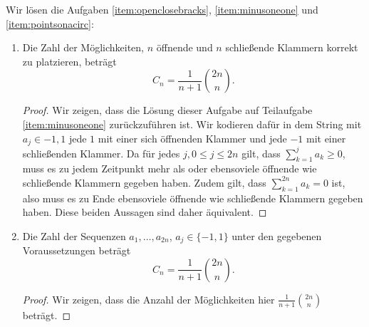 \documentclass{scrartcl} %
\begin{document}
    \begin{aufgabe}
        Wir lösen die Aufgaben \ref{item:openclosebracks}, \ref{item:minusoneone} und \ref{item:pointsonacirc}:
        \begin{enumerate}[label=(\alph*)]
            \item\label{item:openclosebracks} Die Zahl der Möglichkeiten, $n$ öffnende und $n$ schließende Klammern korrekt zu platzieren, beträgt
            \[
                C_n = \frac{1}{n + 1}\binom{2n}{n}.
            \]
            \begin{proof}
                Wir zeigen, dass die Lösung dieser Aufgabe auf Teilaufgabe \ref{item:minusoneone} zurückzuführen ist. Wir kodieren dafür in dem String mit $a_j \in {-1, 1}$ jede $1$ mit einer sich öffnenden Klammer und jede $-1$ mit einer schließenden Klammer. Da für jedes $j, 0 \leq j \leq 2n$ gilt, dass $\sum_{k = 1}^j a_k\geq 0$, muss es zu jedem Zeitpunkt mehr als oder ebensoviele öffnende wie schließende Klammern gegeben haben. Zudem gilt, dass $\sum_{k = 1}^{2n} a_k = 0$ ist, also muss es zu Ende ebensoviele öffnende wie schließende Klammern gegeben haben. Diese beiden Aussagen sind daher äquivalent.
            \end{proof}
            \item\label{item:minusoneone} Die Zahl der Sequenzen $a_1,\ldots, a_{2n}$, $a_j \in \{-1,1\}$ unter den gegebenen Voraussetzungen beträgt
            \[
                C_n = \frac{1}{n + 1}\binom{2n}{n}.
            \]
            \begin{proof}
                Wir zeigen, dass die Anzahl der Möglichkeiten hier $\frac{1}{n + 1}\binom{2n}{n}$ beträgt.


\end{proof}
\end{enumerate}
\end{aufgabe}
\end{document}
